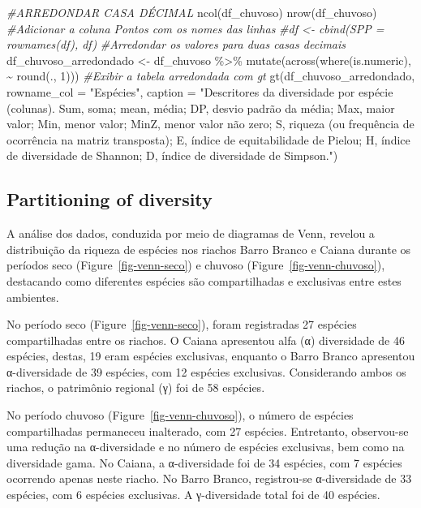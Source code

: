 \documentclass[
  letterpaper,
  DIV=11,
  numbers=noendperiod]{scrartcl}
\newenvironment{Shaded}{}{}
\newcommand{\AttributeTok}[1]{\textcolor[rgb]{0.49,0.56,0.16}{#1}}
\newcommand{\CommentTok}[1]{\textcolor[rgb]{0.38,0.63,0.69}{\textit{#1}}}
\newcommand{\DecValTok}[1]{\textcolor[rgb]{0.25,0.63,0.44}{#1}}
\newcommand{\FunctionTok}[1]{\textcolor[rgb]{0.02,0.16,0.49}{#1}}
\newcommand{\NormalTok}[1]{#1}
\newcommand{\OtherTok}[1]{\textcolor[rgb]{0.00,0.44,0.13}{#1}}
\newcommand{\SpecialCharTok}[1]{\textcolor[rgb]{0.25,0.44,0.63}{#1}}
\newcommand{\StringTok}[1]{\textcolor[rgb]{0.25,0.44,0.63}{#1}}
\begin{document}
\begin{Shaded}
\begin{Highlighting}[numbers=left,,]
\CommentTok{\#ARREDONDAR CASA DÉCIMAL}
\FunctionTok{ncol}\NormalTok{(df\_chuvoso)}
\FunctionTok{nrow}\NormalTok{(df\_chuvoso)}
\CommentTok{\#Adicionar a coluna \textquotesingle{}Pontos\textquotesingle{} com os nomes das linhas}
\CommentTok{\#df \textless{}{-} cbind(SPP = rownames(df), df)}
\CommentTok{\#Arredondar os valores para duas casas decimais}
\NormalTok{df\_chuvoso\_arredondado }\OtherTok{\textless{}{-}}\NormalTok{ df\_chuvoso }\SpecialCharTok{\%\textgreater{}\%}
  \FunctionTok{mutate}\NormalTok{(}\FunctionTok{across}\NormalTok{(}\FunctionTok{where}\NormalTok{(is.numeric), }\SpecialCharTok{\textasciitilde{}} \FunctionTok{round}\NormalTok{(., }\DecValTok{1}\NormalTok{)))}
\CommentTok{\#Exibir a tabela arredondada com gt}
\FunctionTok{gt}\NormalTok{(df\_chuvoso\_arredondado, }\AttributeTok{rowname\_col =} \StringTok{"Espécies"}\NormalTok{, }\AttributeTok{caption =} \StringTok{"Descritores da diversidade por espécie (colunas). Sum, soma; mean, média; DP, desvio padrão da média; Max, maior valor; Min, menor valor; MinZ, menor valor não zero; S, riqueza (ou frequência de ocorrência na matriz transposta); E, índice de equitabilidade de Pielou; H, índice de diversidade de Shannon; D, índice de diversidade de Simpson."}\NormalTok{)}
\end{Highlighting}
\end{Shaded}

\subsection{Partitioning of diversity}\label{partitioning-of-diversity}

A análise dos dados, conduzida por meio de diagramas de Venn, revelou a
distribuição da riqueza de espécies nos riachos Barro Branco e Caiana
durante os períodos seco (Figure~\ref{fig-venn-seco}) e chuvoso
(Figure~\ref{fig-venn-chuvoso}), destacando como diferentes espécies são
compartilhadas e exclusivas entre estes ambientes.

No período seco (Figure~\ref{fig-venn-seco}), foram registradas 27
espécies compartilhadas entre os riachos. O Caiana apresentou alfa (α)
diversidade de 46 espécies, destas, 19 eram espécies exclusivas,
enquanto o Barro Branco apresentou α-diversidade de 39 espécies, com 12
espécies exclusivas. Considerando ambos os riachos, o patrimônio
regional (γ) foi de 58 espécies.

No período chuvoso (Figure~\ref{fig-venn-chuvoso}), o número de espécies
compartilhadas permaneceu inalterado, com 27 espécies. Entretanto,
observou-se uma redução na α-diversidade e no número de espécies
exclusivas, bem como na diversidade gama. No Caiana, a α-diversidade foi
de 34 espécies, com 7 espécies ocorrendo apenas neste riacho. No Barro
Branco, registrou-se α-diversidade de 33 espécies, com 6 espécies
exclusivas. A γ-diversidade total foi de 40 espécies.
\end{document}
